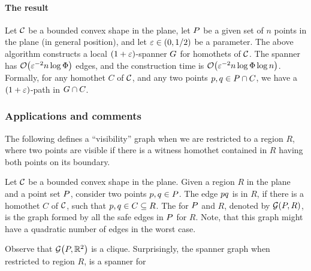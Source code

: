 \documentclass[12pt]{article}%
\begin{document}
\paragraph{The result}

\begin{theorem}
    Let $\mathcal{C}$ be a bounded convex shape in the plane, let $P$ be a
    given set of $n$ points in the plane (in general position), and
    let $\varepsilon \in (0,1/2)$ be a parameter. The above algorithm
    constructs a local $(1+\varepsilon)$-spanner $G$ for homothets of
    $\mathcal{C}$. The spanner has $\Of\pth{ \eps^{-2} n\log \spread }$ edges,
    and the construction time is
    $\Of\pth{ \eps^{-2} n\log \spread \log n }$.  Formally, for any
    homothet $C$ of $\mathcal{C}$, and any two points
    $p, q \in P \cap C$, we have a $(1+\varepsilon)$-path in
    $G \cap {C}$.
\end{theorem}

\subsubsection{Applications and comments}

The following defines a ``visibility'' graph when we are restricted to
a region $R$, where two points are visible if there is a witness
homothet contained in $R$ having both points on its boundary.
\begin{defn}
    Let $\mathcal{C}$ be a bounded convex shape in the plane.  Given a region
    $R$ in the plane and a point set $P$, consider two points
    $p, q \in P$. The edge $p q$ is  in $R$, if
    there is a homothet $C$ of $\mathcal{C}$, such that
    $p,q \in C \subseteq R$. The  for $P$ and
    $R$, denoted by $\GY{\PS}{R}$, is the graph formed by all the safe
    edges in $P$ for $R$. Note, that this graph might have a
    quadratic number of edges in the worst case.
\end{defn}

Observe that $\GY{\PS}{\Re^2}$ is a clique. Surprisingly, the spanner
graph when restricted to region $R$, is a spanner for
\end{document}
